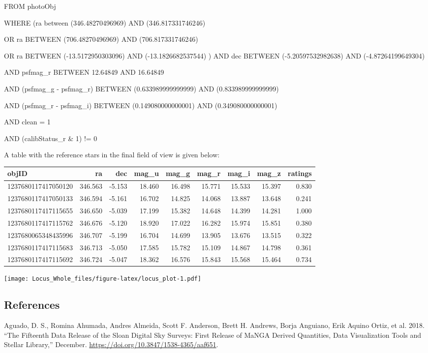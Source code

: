 \documentclass[]{elsarticle} %
\begin{document}
FROM photoObj

WHERE (ra between (346.48270496969) AND (346.817331746246)

OR ra BETWEEN (706.48270496969) AND (706.817331746246)

OR ra BETWEEN (-13.5172950303096) AND (-13.1826682537544) ) AND dec
BETWEEN (-5.20597532982638) AND (-4.87264199649304)

AND psfmag\_r BETWEEN 12.64849 AND 16.64849

AND (psfmag\_g - psfmag\_r) BETWEEN (0.633989999999999) AND
(0.833989999999999)

AND (psfmag\_r - psfmag\_i) BETWEEN (0.149080000000001) AND
(0.349080000000001)

AND clean = 1

AND (calibStatus\_r \& 1) != 0 \vskip 0.2in

A table with the reference stars in the final field of view is given
below:

\begin{longtable}[]{@{}lrrrrrrrr@{}}
\toprule
objID & ra & dec & mag\_u & mag\_g & mag\_r & mag\_i & mag\_z &
ratings\tabularnewline
\midrule
\endhead
1237680117417050120 & 346.563 & -5.153 & 18.460 & 16.498 & 15.771 &
15.533 & 15.397 & 0.830\tabularnewline
1237680117417050133 & 346.594 & -5.161 & 16.702 & 14.825 & 14.068 &
13.887 & 13.648 & 0.241\tabularnewline
1237680117417115655 & 346.650 & -5.039 & 17.199 & 15.382 & 14.648 &
14.399 & 14.281 & 1.000\tabularnewline
1237680117417115762 & 346.676 & -5.120 & 18.920 & 17.022 & 16.282 &
15.974 & 15.851 & 0.380\tabularnewline
1237680065348435996 & 346.707 & -5.199 & 16.704 & 14.699 & 13.905 &
13.676 & 13.515 & 0.322\tabularnewline
1237680117417115683 & 346.713 & -5.050 & 17.585 & 15.782 & 15.109 &
14.867 & 14.798 & 0.361\tabularnewline
1237680117417115692 & 346.724 & -5.047 & 18.362 & 16.576 & 15.843 &
15.568 & 15.464 & 0.734\tabularnewline
\bottomrule
\end{longtable}

\texttt{[image: Locus\_Whole\_files/figure-latex/locus\_plot-1.pdf]}

\newpage

\hypertarget{references}{%
\subsection*{References}\label{references}}

\hypertarget{refs}{}
\leavevmode\hypertarget{ref-Aguado2018}{}%
Aguado, D. S., Romina Ahumada, Andres Almeida, Scott F. Anderson, Brett
H. Andrews, Borja Anguiano, Erik Aquino Ortiz, et al. 2018. ``The
Fifteenth Data Release of the Sloan Digital Sky Surveys: First Release
of MaNGA Derived Quantities, Data Visualization Tools and Stellar
Library,'' December. \url{https://doi.org/10.3847/1538-4365/aaf651}.
\end{document}
